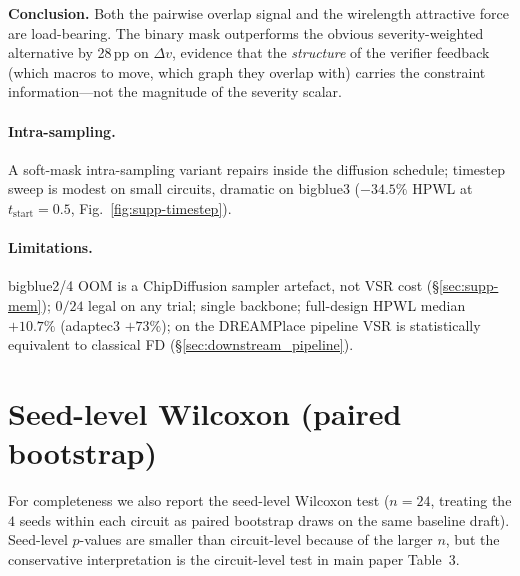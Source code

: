 \documentclass{article}
\begin{document}
\textbf{Conclusion.}  Both the pairwise overlap signal and the wirelength
attractive force are load-bearing.  The binary mask outperforms the obvious
severity-weighted alternative by 28\,pp on $\Delta v$, evidence that the
\emph{structure} of the verifier feedback (which macros to move, which graph
they overlap with) carries the constraint information---not the magnitude
of the severity scalar.

\paragraph{Intra-sampling.}
\label{sec:intra_results}
A soft-mask intra-sampling variant repairs inside the diffusion
schedule; timestep sweep is modest on small circuits, dramatic on
bigblue3 ($-34.5\%$ HPWL at $t_\text{start}{=}0.5$,
Fig.~\ref{fig:supp-timestep}).

\paragraph{Limitations.}
\label{sec:limitations}
bigblue2/4 OOM is a ChipDiffusion sampler artefact, not VSR cost
(\S\ref{sec:supp-mem}); $0/24$ legal on any trial; single backbone;
full-design HPWL median $+10.7\%$ (adaptec3 $+73\%$); on the DREAMPlace
pipeline VSR is statistically equivalent to classical FD
(\S\ref{sec:downstream_pipeline}).




\clearpage
\appendix

\section{Seed-level Wilcoxon (paired bootstrap)}
\label{sec:supp-wilcoxon-seed}

For completeness we also report the seed-level Wilcoxon test ($n=24$,
treating the $4$ seeds within each circuit as paired bootstrap draws on the
same baseline draft).  Seed-level $p$-values are smaller than circuit-level
because of the larger $n$, but the conservative interpretation is the
circuit-level test in main paper Table~3.

\begin{table}[h]
\centering
\small

\caption{Seed-level paired Wilcoxon, $n=24$ (4 seeds within each of 6
circuits, treated as paired bootstrap draws).  Use as a lower bound on
$p$-values; the circuit-level test (Table~3) is the conservative test we
report.}
\label{tab:wilcoxon-seed}
\end{table}
\end{document}
